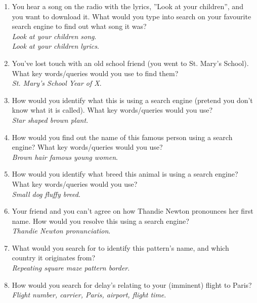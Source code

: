 \documentclass[a4paper, 11pt]{article}
\begin{document}
\begin{enumerate}
\item{You hear a song on the radio with the lyrics, ”Look at your children”, and you want to download it. What would you type into search on your favourite search engine to find out what song it was?\\\textit{Look at your children song}. \\\textit{Look at your children lyrics}.}
\item{You’ve lost touch with an old school friend (you went to St. Mary’s School). What key words/queries would you use to find them?\\\textit{St. Mary’s School Year of X}.}
\item{How would you identify what this is using a search engine (pretend you don’t know what it is called). What key words/queries would you use?\\\textit{Star shaped brown plant}.}
\item{How would you find out the name of this famous person using a search engine? What key words/queries would you use?\\\textit{Brown hair famous young women}.}
\item{How would you identify what breed this animal is using a search engine? What key words/queries would you use?\\\textit{Small dog fluffy breed}.}
\item{Your friend and you can’t agree on how Thandie Newton pronounces her first name. How would you resolve this using a search engine?\\\textit{Thandie Newton pronunciation}.}
\item{What would you search for to identify this pattern’s name, and which country it originates from?\\\textit{Repeating square maze pattern border}.}
\item{How would you search for delay’s relating to your (imminent) flight to Paris?\\\textit{Flight number, carrier, Paris, airport, flight time}.}
\end{enumerate}
\end{document}

